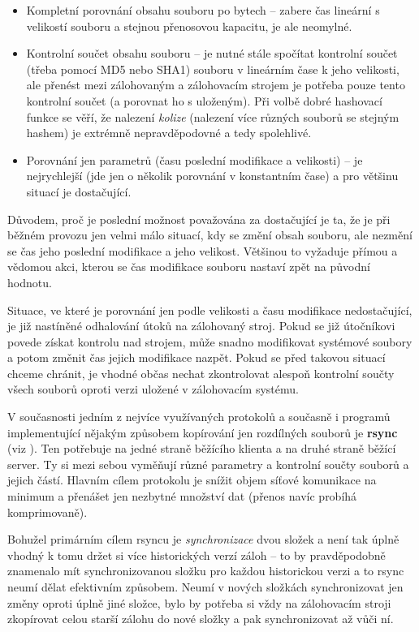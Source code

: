 \begin{itemize}
	\item Kompletní porovnání obsahu souboru po bytech -- zabere čas lineární
	s velikostí souboru a stejnou přenosovou kapacitu, je ale neomylné.
	\item Kontrolní součet obsahu souboru -- je nutné stále spočítat kontrolní
	součet (třeba pomocí \gls{MD5} nebo \gls{SHA1}) souboru v lineárním čase
	k jeho velikosti, ale přenést mezi zálohovaným a zálohovacím strojem je
	potřeba pouze tento kontrolní součet (a porovnat ho s uloženým). Při volbě
	dobré hashovací funkce se věří, že nalezení {\it kolize} (nalezení více
	různých souborů se stejným hashem) je extrémně nepravděpodovné a tedy
	spolehlivé.
	\item Porovnání jen parametrů (času poslední modifikace a velikosti) --
	je nejrychlejší (jde jen o několik porovnání v konstantním čase) a pro
	většinu situací je dostačující.
\end{itemize}

Důvodem, proč je poslední možnost považována za dostačující je ta, že je při
běžném provozu jen velmi málo situací, kdy se změní obsah souboru, ale nezmění
se čas jeho poslední modifikace a jeho velikost. Většinou to vyžaduje přímou
a vědomou akci, kterou se čas modifikace souboru nastaví zpět na původní
hodnotu.

Situace, ve které je porovnání jen podle velikosti a času modifikace
nedostačující, je již nastíněné odhalování útoků na zálohovaný stroj. Pokud se
již útočníkovi povede získat kontrolu nad strojem, může snadno modifikovat
systémové soubory a potom změnit čas jejich modifikace nazpět. Pokud se před
takovou situací chceme chránit, je vhodné občas nechat zkontrolovat alespoň
kontrolní součty všech souborů oproti verzi uložené v zálohovacím systému.

V současnosti jedním z nejvíce využívaných protokolů a současně i programů
implementující nějakým způsobem kopírování jen rozdílných souborů je {\bf rsync}
(viz \cite{rsync}). Ten potřebuje na jedné straně běžícího klienta a na druhé
straně běžící server. Ty si mezi sebou vyměňují různé parametry a kontrolní
součty souborů a jejich částí. Hlavním cílem protokolu je snížit objem síťové
komunikace na minimum a přenášet jen nezbytné množství dat (přenos navíc probíhá
komprimovaně).

Bohužel primárním cílem rsyncu je {\it synchronizace} dvou složek a není tak
úplně vhodný k tomu držet si více historických verzí záloh -- to by pravděpodobně
znamenalo mít synchronizovanou složku pro každou historickou verzi a to rsync
neumí dělat efektivním způsobem. Neumí v nových složkách synchronizovat jen
změny oproti úplně jiné složce, bylo by potřeba si vždy na zálohovacím stroji
zkopírovat celou starší zálohu do nové složky a pak synchronizovat až vůči ní.

